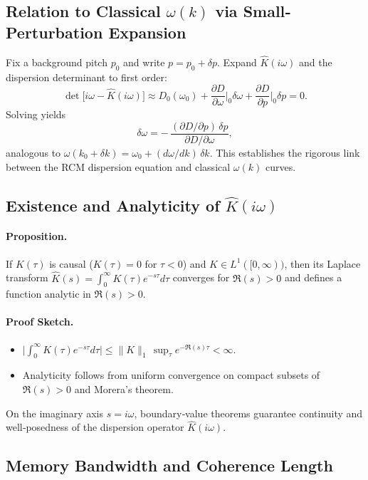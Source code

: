 \subsection{Relation to Classical \(\omega(k)\) via Small‐Perturbation Expansion}

Fix a background pitch $p_{0}$ and write $p=p_{0}+\delta p$.  Expand $\widehat K(i\omega)$ and the dispersion determinant to first order:
\[
\det\bigl[i\omega - \widehat K(i\omega)\bigr]
\approx
D_{0}(\omega_{0})
+ \frac{\partial D}{\partial\omega}\Big|_{0}\!\delta\omega
+ \frac{\partial D}{\partial p}\Big|_{0}\!\delta p = 0.
\]
Solving yields
\[
\delta\omega
= -\,\frac{(\partial D/\partial p)\,\delta p}{\partial D/\partial\omega},
\]
analogous to $\omega(k_{0}+\delta k)=\omega_{0} + (d\omega/dk)\,\delta k$.  This establishes the rigorous link between the RCM dispersion equation and classical $\omega(k)$ curves.

\subsection{Existence and Analyticity of \(\widehat K(i\omega)\)}

\paragraph{Proposition.} If $K(\tau)$ is causal ($K(\tau)=0$ for $\tau<0$) and $K\in L^{1}([0,\infty))$, then its Laplace transform
\(\widehat K(s)=\int_{0}^{\infty}K(\tau)e^{-s\tau}d\tau\)
converges for $\Re(s)>0$ and defines a function analytic in $\Re(s)>0$.  

\paragraph{Proof Sketch.}  
\begin{itemize}
  \item \(\bigl|\int_0^\infty K(\tau)e^{-s\tau}d\tau\bigr|\le \|K\|_{1}\,\sup_{\tau}e^{-\Re(s)\tau}<\infty\).
  \item Analyticity follows from uniform convergence on compact subsets of $\Re(s)>0$ and Morera’s theorem.
\end{itemize}
On the imaginary axis $s=i\omega$, boundary‐value theorems guarantee continuity and well‐posedness of the dispersion operator $\widehat K(i\omega)$.

\subsection{Memory Bandwidth and Coherence Length}

